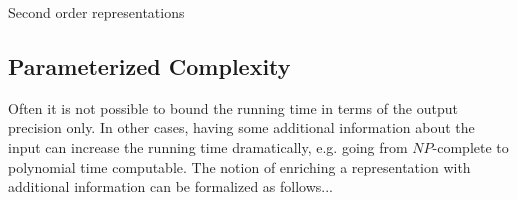 		Second order representations
 	\subsection{Parameterized Complexity}
 		Often it is not possible to bound the running time in terms of the output precision only.
 		In other cases, having some additional information about the input can increase the running time dramatically,
 		e.g. going from $NP$-complete to polynomial time computable.
 		The notion of enriching a representation with additional information can be formalized as follows...
	